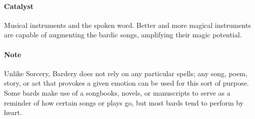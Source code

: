 \paragraph{Catalyst} Musical instruments and the spoken word.
Better and more magical instruments are capable of augmenting the bardic songs, amplifying their magic potential.

\paragraph{Note} Unlike Sorcery, Bardery does not rely on any particular spells; 
any song, poem, story, or act that provokes a given emotion can be used for this sort of purpose.
Some bards make use of a songbooks, novels, or manuscripts to serve as a reminder of how certain songs or plays go, but most bards tend to perform by heart.
